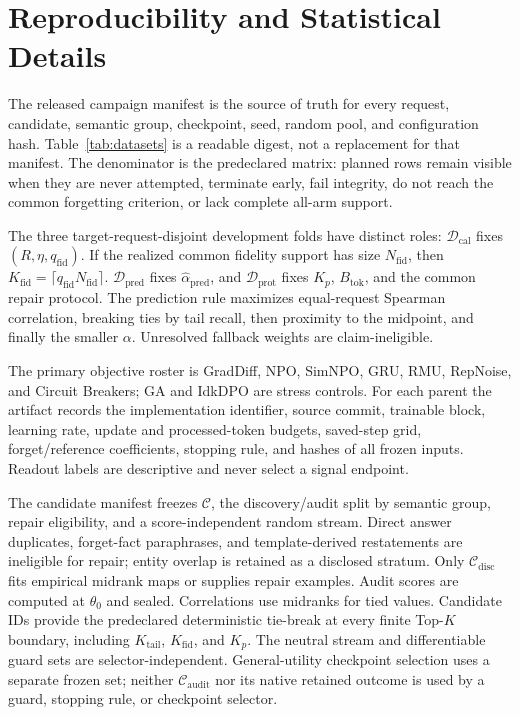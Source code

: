 
\section{Reproducibility and Statistical Details}
\label{app:evaluation-contract}
\label{app:datasets}
\label{app:objectives}

The released campaign manifest is the source of truth for every request,
candidate, semantic group, checkpoint, seed, random pool, and configuration
hash. Table~\ref{tab:datasets} is a readable digest, not a replacement for
that manifest. The denominator is the predeclared matrix: planned rows remain
visible when they are never attempted, terminate early, fail integrity, do not
reach the common forgetting criterion, or lack complete all-arm support.

The three target-request-disjoint development folds have distinct roles:
$\mathcal D_{\mathrm{cal}}$ fixes $(R,\eta,q_{\mathrm{fid}})$. If the realized
common fidelity support has size $N_{\mathrm{fid}}$, then
$K_{\mathrm{fid}}=\lceil q_{\mathrm{fid}}N_{\mathrm{fid}}\rceil$.
$\mathcal D_{\mathrm{pred}}$ fixes $\widehat\alpha_{\mathrm{pred}}$, and
$\mathcal D_{\mathrm{prot}}$ fixes $K_p$,
$B_{\mathrm{tok}}$, and the common repair protocol.
The prediction rule maximizes equal-request Spearman correlation, breaking ties
by tail recall, then proximity to the midpoint, and finally the smaller
$\alpha$. Unresolved fallback weights are claim-ineligible.



The primary objective roster is GradDiff, NPO, SimNPO, GRU, RMU, RepNoise,
and Circuit Breakers; GA and IdkDPO are stress controls. For each parent the
artifact records the implementation identifier, source commit, trainable
block, learning rate, update and processed-token budgets, saved-step grid,
forget/reference coefficients, stopping rule, and hashes of all frozen
inputs. Readout labels are descriptive and never select a signal endpoint.

The candidate manifest freezes $\mathcal C$, the discovery/audit split by
semantic group, repair eligibility, and a score-independent random stream. Direct
answer duplicates, forget-fact paraphrases, and template-derived restatements
are ineligible for repair; entity overlap is retained as a disclosed stratum.
Only $\mathcal C_{\mathrm{disc}}$ fits empirical midrank maps or supplies repair
examples. Audit scores are computed at $\theta_0$ and sealed. Correlations use
midranks for tied values. Candidate IDs provide the predeclared deterministic
tie-break at every finite Top-$K$ boundary, including $K_{\mathrm{tail}}$,
$K_{\mathrm{fid}}$, and $K_p$.
The neutral stream and differentiable guard sets are selector-independent.
General-utility checkpoint selection uses a separate frozen set; neither
$\mathcal C_{\mathrm{audit}}$ nor its native retained outcome is used by a guard,
stopping rule, or checkpoint selector.

